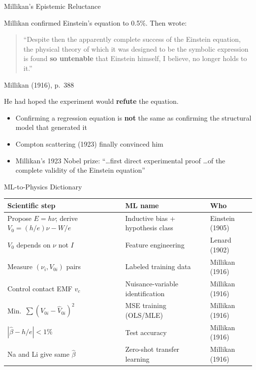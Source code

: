 \documentclass[aspectratio=169]{beamer}
\begin{document}
\begin{frame}{Millikan's Epistemic Reluctance}

Millikan confirmed Einstein's equation to 0.5\%. Then wrote:

\bigskip
\begin{quote}
``Despite then the apparently complete success of the Einstein equation,
the physical theory of which it was designed to be the symbolic expression
is found \textbf{so untenable} that Einstein himself, I believe, no longer
holds to it.''
\end{quote}

\quad \quad \quad Millikan (1916), p.\ 388

\bigskip
He had hoped the experiment would \textbf{refute} the equation.

\bigskip
\begin{itemize}
  \item Confirming a regression equation is \textbf{not} the same as
    confirming the structural model that generated it
  \item Compton scattering (1923) finally convinced him
  \item Millikan's 1923 Nobel prize: ``\ldots first direct experimental proof
    \ldots of the complete validity of the Einstein equation''
\end{itemize}

\end{frame}

\begin{frame}{ML-to-Physics Dictionary}

\begin{center}
\small
\begin{tabular}{p{5.0cm}p{4.8cm}p{2.6cm}}
\toprule
\textbf{Scientific step} & \textbf{ML name} & \textbf{Who} \\
\midrule
Propose $E = h\nu$; derive $V_0 = (h/e)\nu - W/e$
  & Inductive bias + hypothesis class & Einstein (1905) \\
$V_0$ depends on $\nu$ not $I$
  & Feature engineering & Lenard (1902) \\
Measure $(\nu_i, V_{0i})$ pairs
  & Labeled training data & Millikan (1916) \\
Control contact EMF $v_c$
  & Nuisance-variable identification & Millikan (1916) \\
Min.\ $\sum(V_{0i} - \hat V_{0i})^2$
  & MSE training (OLS/MLE) & Millikan (1916) \\
$|\hat\beta - h/e| < 1\%$
  & Test accuracy & Millikan (1916) \\
Na and Li give same $\hat\beta$
  & Zero-shot transfer learning & Millikan (1916) \\
\bottomrule
\end{tabular}
\end{center}

\end{frame}
\end{document}
